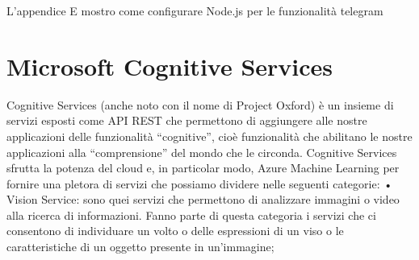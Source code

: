 L'appendice E mostro come configurare Node.js per le funzionalità telegram

\section{Microsoft Cognitive Services} 
Cognitive Services (anche noto con il nome di Project Oxford) è un insieme di servizi esposti come API REST che permettono di aggiungere alle nostre applicazioni delle funzionalità “cognitive”, cioè funzionalità che abilitano le nostre applicazioni alla “comprensione” del mondo che le circonda.
Cognitive Services sfrutta la potenza del cloud e, in particolar modo, Azure Machine Learning per fornire una pletora di servizi che possiamo dividere nelle seguenti categorie:
•	Vision Service: sono quei servizi che permettono di analizzare immagini o video alla ricerca di informazioni. Fanno parte di questa categoria i servizi che ci consentono di individuare un volto o delle espressioni di un viso o le caratteristiche di un oggetto presente in un’immagine;


